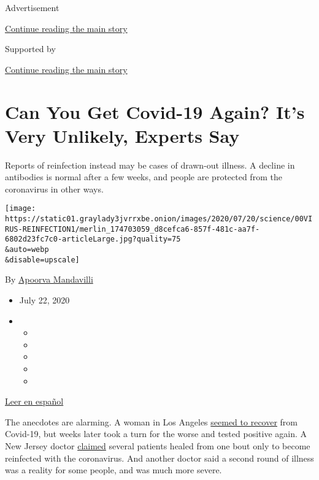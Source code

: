 Advertisement

\protect\hyperlink{after-top}{Continue reading the main story}

Supported by

\protect\hyperlink{after-sponsor}{Continue reading the main story}

\hypertarget{can-you-get-covid-19-again-its-very-unlikely-experts-say}{%
\section{Can You Get Covid-19 Again? It's Very Unlikely, Experts
Say}\label{can-you-get-covid-19-again-its-very-unlikely-experts-say}}

Reports of reinfection instead may be cases of drawn-out illness. A
decline in antibodies is normal after a few weeks, and people are
protected from the coronavirus in other ways.

\texttt{[image: https://static01.graylady3jvrrxbe.onion/images/2020/07/20/science/00VIRUS-REINFECTION1/merlin\_174703059\_d8cefca6-857f-481c-aa7f-6802d23fc7c0-articleLarge.jpg?quality=75\\\&auto=webp\\\&disable=upscale]}

By
\href{https://www.nytimes3xbfgragh.onion/by/apoorva-mandavilli}{Apoorva
Mandavilli}

\begin{itemize}
\item
  July 22, 2020
\item
  \begin{itemize}
  \item
  \item
  \item
  \item
  \item
  \end{itemize}
\end{itemize}

\href{https://www.nytimes3xbfgragh.onion/es/2020/07/24/espanol/ciencia-y-tecnologia/reinfeccion-coronavirus.html}{Leer
en español}

The anecdotes are alarming. A woman in Los Angeles
\href{https://www.foxla.com/news/southern-california-woman-tests-positive-for-covid-19-for-second-time-after-initial-recovery}{seemed
to recover} from Covid-19, but weeks later took a turn for the worse and
tested positive again. A New Jersey doctor
\href{https://dailyvoice.com/new-jersey/monmouth/news/central-jersey-doctor-reports-patients-reinfected-with-coronavirus/790555/}{claimed}
several patients healed from one bout only to become reinfected with the
coronavirus. And another doctor said a second round of illness was a
reality for some people, and was much more severe.

